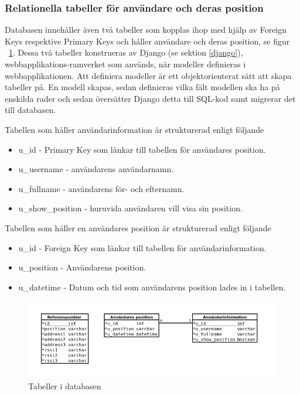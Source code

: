 \documentclass[a4paper,12pt]{article}
\begin{document}
 \subsubsection{Relationella tabeller för användare och deras position}
 Databasen innehåller även två tabeller som
 kopplas ihop med hjälp av Foreign Keys respektive Primary Keys och håller användare och deras position, se figur ~\ref{fig:db_tabeller}.
 Dessa två tabeller konstrueras av Django (se sektion \ref{django}), webbapplikations-ramverket som används, när modeller definieras i webbapplikationen. Att definiera modeller är ett objektorienterat sätt att skapa tabeller på. En modell skapas, sedan definieras vilka fält modellen ska ha på enskilda rader och sedan översätter Django detta till SQL-kod samt migrerar det till databasen.

 Tabellen som håller användarinformation är strukturerad enligt följande
 \begin{itemize}
   \item  u\_id - Primary Key som länkar till tabellen för användares position.
   \item  u\_username - användarens användarnamn.
   \item  u\_fullname - användarens för- och efternamn.
   \item  u\_show\_position - huruvida användaren vill visa sin position.
 \end{itemize}

 Tabellen som håller en användares position är strukturerad enligt följande
 \begin{itemize}
   \item u\_id - Foreign Key som länkar till tabellen för användarinformation.
   \item u\_position - Användarens position.
   \item u\_datetime - Datum och tid som användarens position lades in i tabellen.
 \end{itemize}

 \begin{figure}[H]
   \includegraphics[width=15cm]{media/db_tabeller.png}
   \caption{Tabeller i databasen}
   \label{fig:db_tabeller}
 \end{figure}
\end{document}
